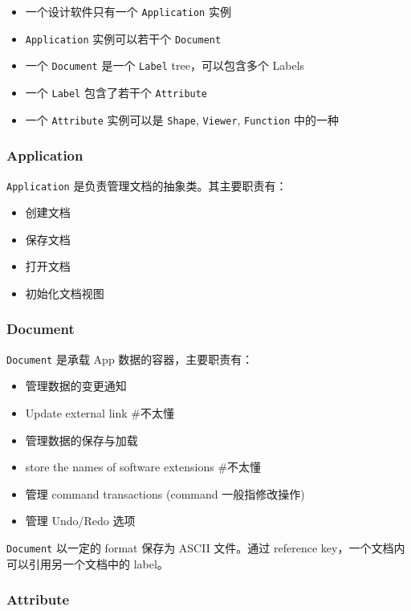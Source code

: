 \documentclass[11pt]{article}
\begin{document}
\begin{itemize}
\item 一个设计软件只有一个 \texttt{Application} 实例
\item \texttt{Application} 实例可以若干个 \texttt{Document}
\item 一个 \texttt{Document} 是一个 \texttt{Label} tree，可以包含多个 Labels
\item 一个 \texttt{Label} 包含了若干个 \texttt{Attribute}
\item 一个 \texttt{Attribute} 实例可以是 \texttt{Shape}, \texttt{Viewer}, \texttt{Function} 中的一种
\end{itemize}
\subsubsection{Application}
\label{sec:org25a552d}

\texttt{Application} 是负责管理文档的抽象类。其主要职责有：

\begin{itemize}
\item 创建文档
\item 保存文档
\item 打开文档
\item 初始化文档视图
\end{itemize}
\subsubsection{Document}
\label{sec:org213a84b}

\texttt{Document} 是承载 App 数据的容器，主要职责有：

\begin{itemize}
\item 管理数据的变更通知
\item Update external link \#不太懂
\item 管理数据的保存与加载
\item store the names of software extensions \#不太懂
\item 管理 command transactions (command 一般指修改操作)
\item 管理 Undo/Redo 选项
\end{itemize}

\texttt{Document} 以一定的 format 保存为 ASCII 文件。通过 reference key，一个文档内可以引用另一个文档中的 label。
\subsubsection{Attribute}
\label{sec:orgab845ca}
\end{document}
